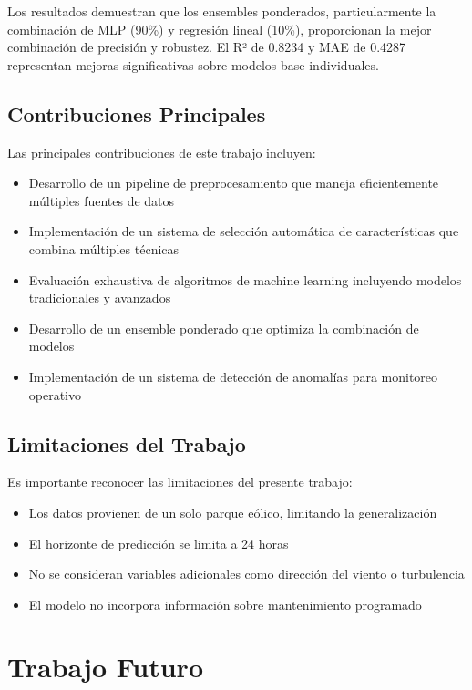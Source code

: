 \documentclass[conference]{IEEEtran}
\begin{document}
	Los resultados demuestran que los ensembles ponderados, particularmente la combinación de MLP (90\%) y regresión lineal (10\%), proporcionan la mejor combinación de precisión y robustez. El R² de 0.8234 y MAE de 0.4287 representan mejoras significativas sobre modelos base individuales.
	
	\subsection{Contribuciones Principales}
	Las principales contribuciones de este trabajo incluyen:
	\begin{itemize}
		\item Desarrollo de un pipeline de preprocesamiento que maneja eficientemente múltiples fuentes de datos
		\item Implementación de un sistema de selección automática de características que combina múltiples técnicas
		\item Evaluación exhaustiva de algoritmos de machine learning incluyendo modelos tradicionales y avanzados
		\item Desarrollo de un ensemble ponderado que optimiza la combinación de modelos
		\item Implementación de un sistema de detección de anomalías para monitoreo operativo
	\end{itemize}
	
	\subsection{Limitaciones del Trabajo}
	Es importante reconocer las limitaciones del presente trabajo:
	\begin{itemize}
		\item Los datos provienen de un solo parque eólico, limitando la generalización
		\item El horizonte de predicción se limita a 24 horas
		\item No se consideran variables adicionales como dirección del viento o turbulencia
		\item El modelo no incorpora información sobre mantenimiento programado
	\end{itemize}
	
	\section{Trabajo Futuro}
	
\end{document}
